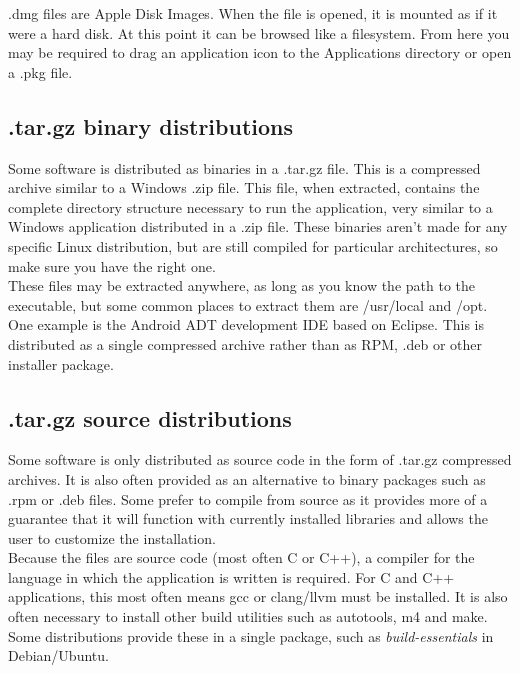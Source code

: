.dmg files are Apple Disk Images.  When the file is opened, it is mounted as if it were a hard disk.  At this point it can be browsed like a filesystem.  From here you may be required to drag an application icon to the Applications directory or open a .pkg file.

\subsection{.tar.gz binary distributions}

Some software is distributed as binaries in a .tar.gz file.  This is a compressed archive similar to a Windows .zip file.  This file, when extracted, contains the complete directory structure necessary to run the application, very similar to a Windows application distributed in a .zip file.  These binaries aren't made for any specific Linux distribution, but are still compiled for particular architectures, so make sure you have the right one.\\

These files may be extracted anywhere, as long as you know the path to the executable, but some common places to extract them are /usr/local and /opt.\\

One example is the Android ADT development IDE based on Eclipse.  This is distributed as a single compressed archive rather than as RPM, .deb or other installer package.

\subsection{.tar.gz source distributions}

Some software is only distributed as source code in the form of .tar.gz compressed archives.  It is also often provided as an alternative to binary packages such as .rpm or .deb files.  Some prefer to compile from source as it provides more of a guarantee that it will function with currently installed libraries and allows the user to customize the installation.\\

Because the files are source code (most often C or C++), a compiler for the language in which the application is written is required.  For C and C++ applications, this most often means gcc or clang/llvm must be installed.  It is also often necessary to install other build utilities such as autotools, m4 and make.  Some distributions provide these in a single package, such as \textit{build-essentials} in Debian/Ubuntu.\\

